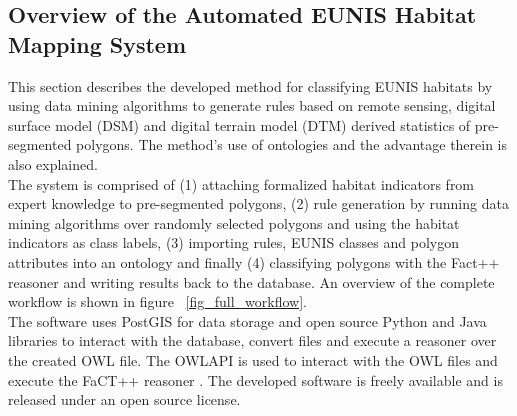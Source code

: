 \documentclass[authoryear, review,12pt,number]{elsarticle}
\begin{document}
\subsection{Overview of the Automated EUNIS Habitat Mapping System}
This section describes the developed method for classifying EUNIS habitats by
using data mining algorithms to generate rules based on remote sensing, digital
surface model (DSM) and digital terrain model (DTM) derived statistics of
pre-segmented polygons. The method's use of ontologies and the advantage
therein is also explained.\\
The system is comprised of (1) attaching
formalized habitat indicators from expert knowledge to pre-segmented polygons,
(2) rule generation by running data mining algorithms over randomly selected
polygons and using the habitat indicators as class labels, (3) importing rules,
EUNIS classes and polygon attributes into an ontology and finally (4)
classifying polygons with the Fact++ reasoner \citep{Tsarkov2006} and writing
results back to the database. An overview of the complete workflow is shown in
figure ~\ref{fig_full_workflow}.\\
The software uses PostGIS for data storage and open source Python and Java 
libraries to interact with the database, convert files and execute a reasoner 
over the created OWL file.
The OWLAPI is used to interact with the OWL files and execute the FaCT++ 
reasoner \citep{Tsarkov2006}. The developed software is freely available and is 
released under an open source license. 
\end{document}

